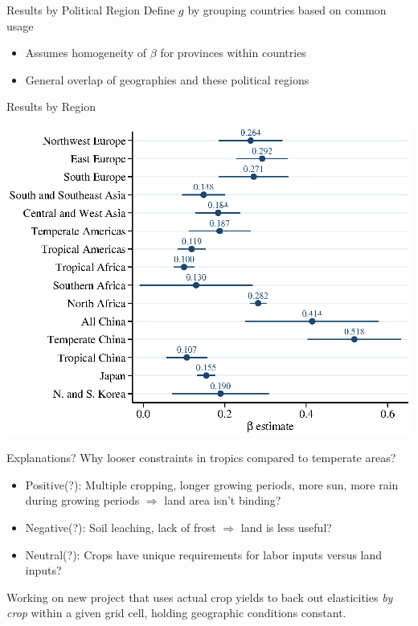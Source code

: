 \documentclass[10pt, xcolor=dvipsnames]{beamer}
\begin{document}
\begin{frame}{Results by Political Region}
Define $g$ by grouping countries based on common usage
\begin{itemize}
  \item Assumes homogeneity of $\beta$ for provinces within countries
  \item General overlap of geographies and these political regions
\end{itemize}
\end{frame}

\begin{frame}{Results by Region}\label{subregion}
\begin{center}
\includegraphics[width=.8\textwidth]{fig_coef_subregion_base.eps}
\end{center}
\hfill \hyperlink{subregiontab}{}
\end{frame}

\begin{frame}{Explanations?}
Why looser constraints in tropics compared to temperate areas?
\begin{itemize}
  \item Positive(?): Multiple cropping, longer growing periods, more sun, more rain during growing periods $\Rightarrow$ land area isn't binding?
  \item Negative(?): Soil leaching, lack of frost $\Rightarrow$ land is less useful?
  \item Neutral(?): Crops have unique requirements for labor inputs versus land inputs?
\end{itemize}

\vspace{.2cm} Working on new project that uses actual crop yields to back out elasticities \textit{by crop} within a given grid cell, holding geographic conditions constant.
\end{frame}
\end{document}
